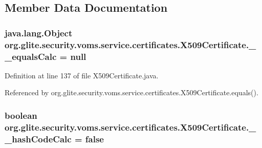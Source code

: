 \subsection{Member Data Documentation}
\hypertarget{classorg_1_1glite_1_1security_1_1voms_1_1service_1_1certificates_1_1X509Certificate_aee6fef67193ba4fe895cc785946a3e02}{
\subsubsection[{\_\-\_\-equalsCalc}]{\setlength{\rightskip}{0pt plus 5cm}java.lang.Object {\bf org.glite.security.voms.service.certificates.X509Certificate.\_\-\_\-equalsCalc} = null}}
\label{classorg_1_1glite_1_1security_1_1voms_1_1service_1_1certificates_1_1X509Certificate_aee6fef67193ba4fe895cc785946a3e02}


Definition at line 137 of file X509Certificate.java.



Referenced by org.glite.security.voms.service.certificates.X509Certificate.equals().

\hypertarget{classorg_1_1glite_1_1security_1_1voms_1_1service_1_1certificates_1_1X509Certificate_ab83c16c95a2a9bdf0414b14dfddae230}{
\subsubsection[{\_\-\_\-hashCodeCalc}]{\setlength{\rightskip}{0pt plus 5cm}boolean {\bf org.glite.security.voms.service.certificates.X509Certificate.\_\-\_\-hashCodeCalc} = false}}
\label{classorg_1_1glite_1_1security_1_1voms_1_1service_1_1certificates_1_1X509Certificate_ab83c16c95a2a9bdf0414b14dfddae230}


